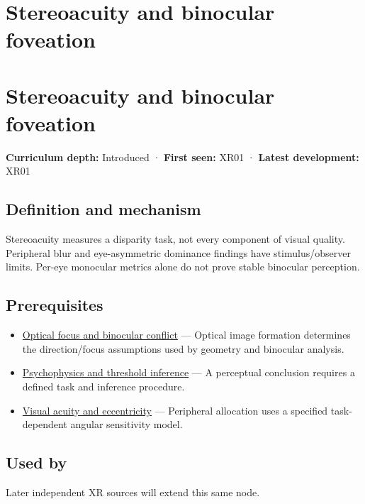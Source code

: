 \hypertarget{appendix-8dc848f14052}{}
\section*{Stereoacuity and binocular foveation}
\section{Stereoacuity and binocular foveation}\label{stereoacuity-and-binocular-foveation}

\textbf{Curriculum depth:} Introduced · \textbf{First seen:} XR01 · \textbf{Latest development:} XR01

\subsection{Definition and mechanism}\label{definition-and-mechanism}

Stereoacuity measures a disparity task, not every component of visual quality. Peripheral blur and eye-asymmetric dominance findings have stimulus/observer limits. Per-eye monocular metrics alone do not prove stable binocular perception.

\subsection{Prerequisites}\label{prerequisites}

\begin{itemize}
\tightlist
\item
  \hyperref[appendix-f90cee1be7a4]{Optical focus and binocular conflict} --- Optical image formation determines the direction/focus assumptions used by geometry and binocular analysis.
\item
  \hyperref[appendix-1759f03e8ce7]{Psychophysics and threshold inference} --- A perceptual conclusion requires a defined task and inference procedure.
\item
  \hyperref[appendix-b491fc48c54b]{Visual acuity and eccentricity} --- Peripheral allocation uses a specified task-dependent angular sensitivity model.
\end{itemize}

\subsection{Used by}\label{used-by}

Later independent XR sources will extend this same node.

